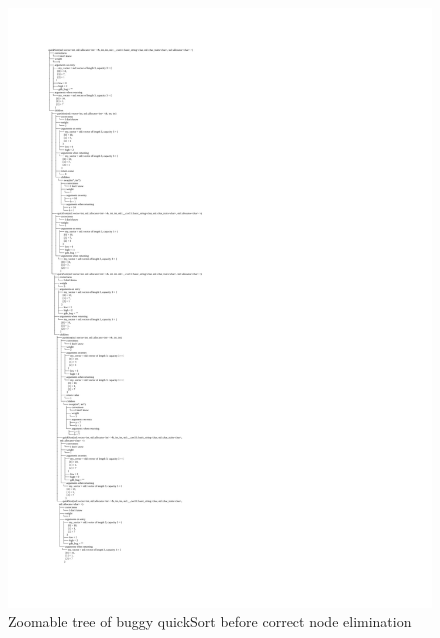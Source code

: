 \begin{figure}[p]
\centering
    \caption{Zoomable tree of buggy quickSort before correct node elimination}
    \label{fig:buggyTreeBefore}
\includegraphics[width=\textwidth,height=\textheight,keepaspectratio]{Imagenes/Vectorial/buggy.pdf}
\end{figure}
